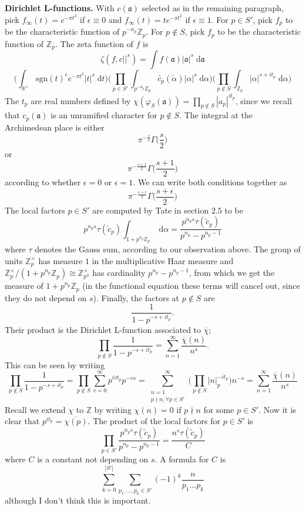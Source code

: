 \documentclass[12pt, letterpaper, twoside]
{article}
\newcommand{\Z}{{\mathbb Z}} %
\newcommand{\R}{{\mathbb R}} %
\newcommand{\dd}[1]{\mathrm{d}#1} %
\newcommand{\aI}{{\mathfrak{a}}} %
\newcommand{\ol}{\overline}
\begin{document}
\textbf{Dirichlet L-functions.} With $c(\aI)$ selected as in the remaining
paragraph, pick $f_\infty(t) = e^{-\pi t^2}$ if $\epsilon \equiv 0$ and
$f_\infty(t) = te^{-\pi t^2}$ if $\epsilon \equiv 1$. For $p \in S'$, pick $f_p$
to be the characteristic function of $p^{-n_p}\Z_p$. For $p \not\in S$, pick
$f_p$ to be the characteristic function of $\Z_p$. The zeta function of $f$ is
\[\zeta(f, c||^s) = \int f(\aI)|\aI|^s \; \dd \aI\]
\[\bigg( \int_{\R^\times} \text{sgn}(t)^\epsilon e^{-\pi t^2} |t|^s \; \dd t
\bigg) \bigg( \prod_{p \in S'} \int_{p^{-n_p}\Z_p}
\tilde{c_p}(\tilde{\alpha})|\alpha|^s \; \dd \alpha\bigg) \bigg( \prod_{p
\not\in S} \int_{\Z_p} |\alpha|^{s + it_p} \; \dd \alpha \bigg)\] The $t_p$ are
real numbers defined by $\chi(\varphi_S(\aI)) = \prod_{p \not\in S}
|a_p|^{it_p}$, since we recall that $c_p(\aI)$ is an unramified character for $p
\not\in S$. The integral at the Archimedean place is either
\[\pi^{-\frac{s}{2}} \Gamma \bigg( \frac{s}{2} \bigg)\] or
\[\pi^{-\frac{s + 1}{2}} \Gamma \bigg( \frac{s + 1}{2}\bigg)\] according to
whether $\epsilon = 0$ or $\epsilon = 1$. We can write both conditions together
as 
\[\pi^{-\frac{s + \epsilon}{2}} \Gamma \bigg( \frac{s + \epsilon}{2} \bigg)\]
The local factors $p \in S'$ are computed by Tate in section $2.5$ to be
\[p^{n_ps} \tau(\tilde{c}_p) \int_{1 + p^{n_p}\Z_p} \; \dd \alpha =
\frac{p^{n_ps}\tau(\tilde{c}_p)}{p^{n_p} - p^{{n_p} - 1}}\] where $\tau$ denotes the
Gauss sum, according to our observation above. The group of units $\Z_p^\times$
has measure $1$ in the multiplicative Haar measure and $\Z_p^\times/(1 +
p^{n_p}\Z_p) \cong \Z_{p^n}^\times$ has cardinality $p^{n_p} - p^{n_p - 1}$,
from which we get the measure of $1 + p^{n_p}\Z_p$ (in the functional equation
these terms will cancel out, since they do not depend on $s$). Finally, the
factors at $p \not\in S$ are
\[\frac{1}{1 - p^{-s + it_p}}.\] Their product is the Dirichlet L-function
associated to $\ol{\chi}$;
\[\prod_{p \not\in S} \frac{1}{1 - p^{-s + it_p}} = \sum_{n = 1}^\infty
\frac{\ol{\chi}(n)}{n^{s}}.\] This can be seen by writing
\[\prod_{p \not\in S} \frac{1}{1 - p^{-s + it_p}} = \prod_{p \not\in S} \sum_{v
= 0}^\infty p^{ivt_p}p^{-vs} = \sum_{\substack{n = 1 \\ p \nmid n, \forall p \in
S'}}^\infty \bigg(\prod_{p \not\in S} |n|_p^{-it_p} \bigg)n^{-s} = \sum_{n =
1}^\infty \frac{\ol{\chi}(n)}{n^s}\] Recall we extend $\chi$ to $\Z$ by writing
$\chi(n) = 0$ if $p \nmid n$ for some $p \in S'$. Now it is clear that $p^{it_p}
= \ol{\chi(p)}$. The product of the local factors for $p \in S'$ is
\[\prod_{p \in S'} \frac{p^{n_ps}\tau(\tilde{c}_p)}{p^{n_p} - p^{n_p - 1}} =
\frac{n^s \tau(\tilde{c}_p)}{C}\] where $C$ is a constant not depending on $s$.
A formula for $C$ is 
\[\sum_{k = 0}^{|S'|} \sum_{p_1, ..., p_k \in S'}(-1)^k \frac{n}{p_1...p_k}\]
although I don't think this is important.
\end{document}
